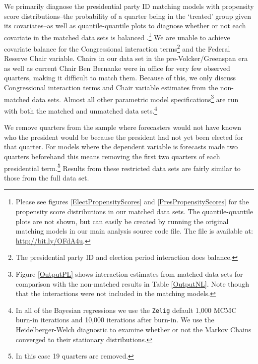 \documentclass[a4paper]{article}\usepackage{graphicx, color}
\begin{document}
We primarily diagnose the presidential party ID matching models with propensity score distributions--the probability of a quarter being in the `treated' group given its covariates--as well as quantile-quantile plots to diagnose whether or not each covariate in the matched data sets is balanced \citep{Ho2007}.\footnote{Please see figures \ref{ElectPropensityScores} and \ref{PresPropensityScores} for the propensity score distributions in our matched data sets. The quantile-quantile plots are not shown, but can easily be created by running the original matching models in our main analysis source code file. The file is available at: \url{http://bit.ly/OFdA4u}.}  We are unable to achieve covariate balance for the Congressional interaction terms\footnote{The presidential party ID and election period interaction does balance.} and the Federal Reserve Chair variable. Chairs in our data set in the pre-Volcker/Greenspan era as well as current Chair Ben Bernanke were in office for very few observed quarters, making it difficult to match them. Because of this, we only discuss Congressional interaction terms and Chair variable estimates from the non-matched data sets. Almost all other parametric model specifications\footnote{Figure \ref{OutputPL} shows interaction estimates from matched data sets for comparison with the non-matched results in Table \ref{OutputNL}. Note though that the interactions were not included in the matching models.} are run with both the matched and unmatched data sets.\footnote{In all of the Bayesian regressions we use the {\tt{Zelig}} default 1,000 MCMC burn-in iterations and 10,000 iterations after burn-in. We use the Heidelberger-Welch diagnostic to examine whether or not the Markov Chains converged to their stationary distributions.}

We remove quarters from the sample where forecasters would not have known who the president would be because the president had not yet been elected for that quarter. For models where the dependent variable is forecasts made two quarters beforehand this means removing the first two quarters of each presidential term.\footnote{In this case 19 quarters are removed.} Results from these restricted data sets are fairly similar to those from the full data set.
\end{document}
